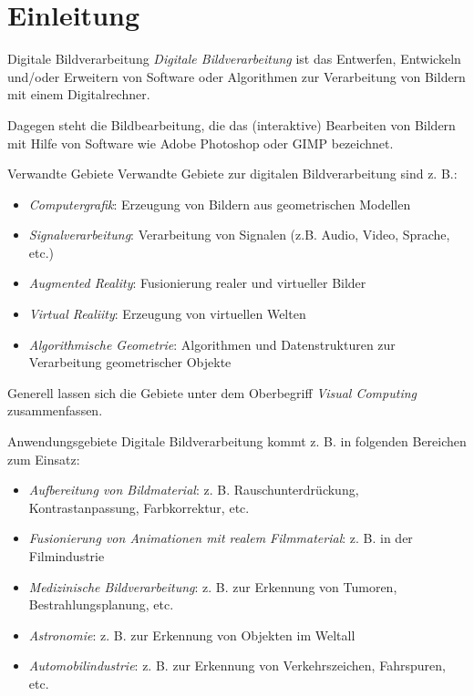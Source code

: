 \section{Einleitung}

\begin{defi}{Digitale Bildverarbeitung}
    \emph{Digitale Bildverarbeitung} ist das Entwerfen, Entwickeln und/oder Erweitern von Software oder Algorithmen zur Verarbeitung von Bildern mit einem Digitalrechner.

    Dagegen steht die Bildbearbeitung, die das (interaktive) Bearbeiten von Bildern mit Hilfe von Software wie Adobe Photoshop oder GIMP bezeichnet.
\end{defi}

\begin{bonus}{Verwandte Gebiete}
    Verwandte Gebiete zur digitalen Bildverarbeitung sind z. B.:
    \begin{itemize}
        \item \emph{Computergrafik}: Erzeugung von Bildern aus geometrischen Modellen
        \item \emph{Signalverarbeitung}: Verarbeitung von Signalen (z.B. Audio, Video, Sprache, etc.)
        \item \emph{Augmented Reality}: Fusionierung realer und virtueller Bilder
        \item \emph{Virtual Realiity}: Erzeugung von virtuellen Welten
        \item \emph{Algorithmische Geometrie}: Algorithmen und Datenstrukturen zur Verarbeitung geometrischer Objekte
    \end{itemize}

    Generell lassen sich die Gebiete unter dem Oberbegriff \emph{Visual Computing} zusammenfassen.
\end{bonus}

\begin{bonus}{Anwendungsgebiete}
    Digitale Bildverarbeitung kommt z. B. in folgenden Bereichen zum Einsatz:
    \begin{itemize}
        \item \emph{Aufbereitung von Bildmaterial}: z. B. Rauschunterdrückung, Kontrastanpassung, Farbkorrektur, etc.
        \item \emph{Fusionierung von Animationen mit realem Filmmaterial}: z. B. in der Filmindustrie
        \item \emph{Medizinische Bildverarbeitung}: z. B. zur Erkennung von Tumoren, Bestrahlungsplanung, etc.
        \item \emph{Astronomie}: z. B. zur Erkennung von Objekten im Weltall
        \item \emph{Automobilindustrie}: z. B. zur Erkennung von Verkehrszeichen, Fahrspuren, etc.
    \end{itemize}
\end{bonus}


